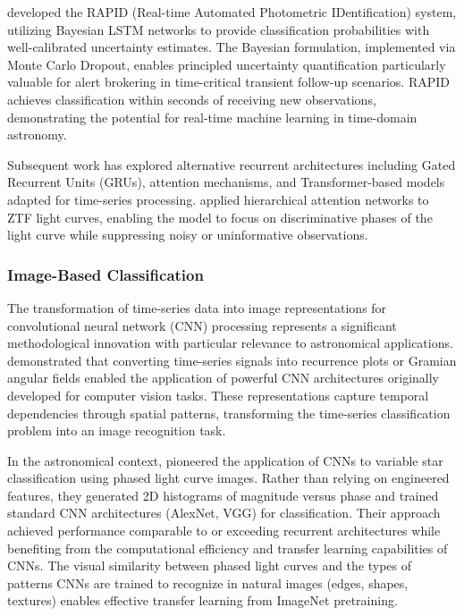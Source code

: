 \documentclass[11pt,a4paper]{article}
\begin{document}
\citet{muthukrishna2019rapid} developed the RAPID (Real-time Automated Photometric IDentification) system, utilizing Bayesian LSTM networks to provide classification probabilities with well-calibrated uncertainty estimates. The Bayesian formulation, implemented via Monte Carlo Dropout, enables principled uncertainty quantification particularly valuable for alert brokering in time-critical transient follow-up scenarios. RAPID achieves classification within seconds of receiving new observations, demonstrating the potential for real-time machine learning in time-domain astronomy.

Subsequent work has explored alternative recurrent architectures including Gated Recurrent Units (GRUs), attention mechanisms, and Transformer-based models adapted for time-series processing. \citet{aleo2023ztf} applied hierarchical attention networks to ZTF light curves, enabling the model to focus on discriminative phases of the light curve while suppressing noisy or uninformative observations.

\subsubsection{Image-Based Classification}

The transformation of time-series data into image representations for convolutional neural network (CNN) processing represents a significant methodological innovation with particular relevance to astronomical applications. \citet{wang2020cnn} demonstrated that converting time-series signals into recurrence plots or Gramian angular fields enabled the application of powerful CNN architectures originally developed for computer vision tasks. These representations capture temporal dependencies through spatial patterns, transforming the time-series classification problem into an image recognition task.

In the astronomical context, \citet{kim2017deep} pioneered the application of CNNs to variable star classification using phased light curve images. Rather than relying on engineered features, they generated 2D histograms of magnitude versus phase and trained standard CNN architectures (AlexNet, VGG) for classification. Their approach achieved performance comparable to or exceeding recurrent architectures while benefiting from the computational efficiency and transfer learning capabilities of CNNs. The visual similarity between phased light curves and the types of patterns CNNs are trained to recognize in natural images (edges, shapes, textures) enables effective transfer learning from ImageNet pretraining.
\end{document}
